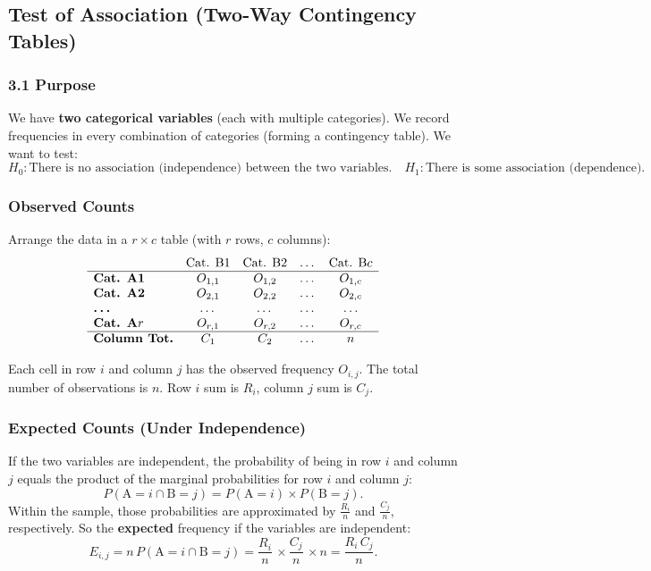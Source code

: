 \documentclass[10pt]{extarticle}
\begin{document}
\subsection{Test of Association (Two-Way Contingency Tables)}

\subsubsection{3.1 Purpose}
We have \textbf{two categorical variables} (each with multiple categories). We record frequencies in every combination of categories (forming a contingency table). We want to test:
$$
    H_0 : \text{There is no association (independence) between the two variables.}
    \quad
    H_1 : \text{There is some association (dependence).}
$$

\subsubsection{Observed Counts}

Arrange the data in a $r \times c$ table (with $r$ rows, $c$ columns):
\[
    \begin{array}{lcccc}
                             & \text{Cat. B1} & \text{Cat. B2} & \dots & \text{Cat. B}c \\
        \hline
        \textbf{Cat. A1}     & O_{1,1}        & O_{1,2}        & \dots & O_{1,c}        \\
        \textbf{Cat. A2}     & O_{2,1}        & O_{2,2}        & \dots & O_{2,c}        \\
        \textbf{\dots}       & \dots          & \dots          & \dots & \dots          \\
        \textbf{Cat. A}r     & O_{r,1}        & O_{r,2}        & \dots & O_{r,c}        \\
        \hline
        \textbf{Column Tot.} & C_1            & C_2            & \dots & n              \\
    \end{array}
\]

Each cell in row $i$ and column $j$ has the observed frequency $O_{i,j}$. The total number of observations is $n$. Row $i$ sum is $R_i$, column $j$ sum is $C_j$.

\subsubsection{Expected Counts (Under Independence)}

If the two variables are independent, the probability of being in row $i$ and column $j$ equals the product of the marginal probabilities for row $i$ and column $j$:
$$
    P(\text{A}=i \cap \text{B}=j)
    = P(\text{A}=i)\times P(\text{B}=j).
$$
Within the sample, those probabilities are approximated by $\frac{R_i}{n}$ and $\frac{C_j}{n}$, respectively. So the \textbf{expected} frequency if the variables are independent:
$$
    E_{i,j}
    = n\,P(\text{A}=i \cap \text{B}=j)
    = \frac{R_i}{n}\,\times \frac{C_j}{n}\,\times n
    = \frac{R_i \, C_j}{n}.
$$
\end{document}
